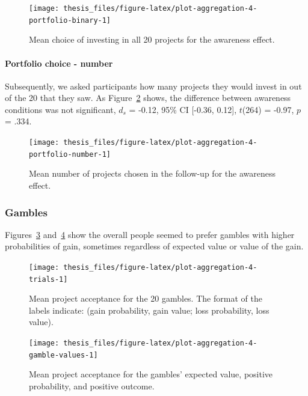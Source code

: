 \documentclass[a4paper, nobind, dvipsnames]{templates/ociamthesis}
\theoremstyle{definition}
\theoremstyle{definition}
\theoremstyle{definition}
\theoremstyle{definition}
\theoremstyle{remark}
\begin{document}
\begin{figure}
\texttt{[image: thesis\_files/figure-latex/plot-aggregation-4-portfolio-binary-1]} \caption{Mean choice of investing in all 20 projects for the awareness effect.}\label{fig:plot-aggregation-4-portfolio-binary}
\end{figure}

\paragraph{Portfolio choice - number}

Subsequently, we asked participants how many projects they would invest in out
of the 20 that they saw. As
Figure~\ref{fig:plot-aggregation-4-portfolio-number} shows, the difference
between awareness conditions was not significant,
\(d_s\) = -0.12, 95\% CI {[}-0.36, 0.12{]}, \(t\)(264) = -0.97, \(p\) = .334.



\begin{figure}
\texttt{[image: thesis\_files/figure-latex/plot-aggregation-4-portfolio-number-1]} \caption{Mean number of projects chosen in the follow-up for the awareness effect.}\label{fig:plot-aggregation-4-portfolio-number}
\end{figure}

\subsubsection{Gambles}

Figures~\ref{fig:plot-aggregation-4-trials}
and~\ref{fig:plot-aggregation-4-gamble-values} show the
overall people seemed to prefer gambles with higher probabilities of gain,
sometimes regardless of expected value or value of the gain.



\begin{figure}
\texttt{[image: thesis\_files/figure-latex/plot-aggregation-4-trials-1]} \caption{Mean project acceptance for the 20 gambles. The format of the labels indicate: (gain probability, gain value; loss probability, loss value).}\label{fig:plot-aggregation-4-trials}
\end{figure}



\begin{figure}
\texttt{[image: thesis\_files/figure-latex/plot-aggregation-4-gamble-values-1]} \caption{Mean project acceptance for the gambles' expected value, positive probability, and positive outcome.}\label{fig:plot-aggregation-4-gamble-values}
\end{figure}
\end{document}
